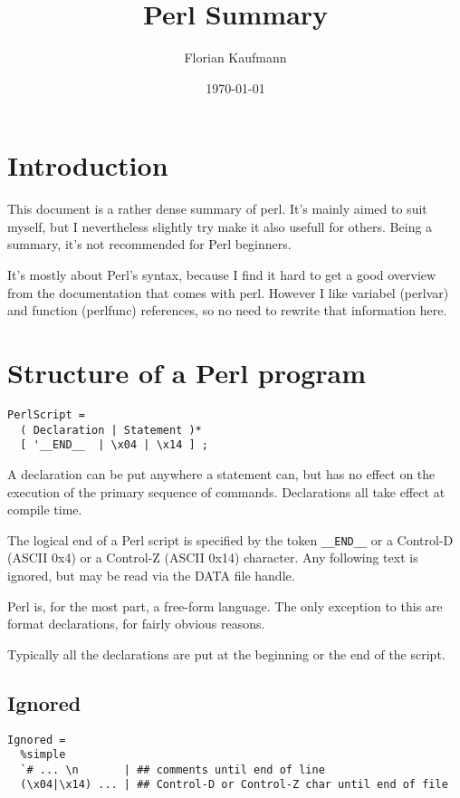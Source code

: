 \documentclass{article}
\begin{document}
\author{Florian Kaufmann}
\title{Perl Summary}
\date{\today}
\maketitle
\tableofcontents

\section{Introduction}

This document is a rather dense summary of perl. It's mainly aimed to suit
myself, but I nevertheless slightly try make it also usefull for others. Being a
summary, it's not recommended for Perl beginners.

It's mostly about Perl's syntax, because I find it hard to get a good overview
from the documentation that comes with perl. However I like variabel (perlvar)
and function (perlfunc) references, so no need to rewrite that information here.

\section{Structure of a Perl program}

\begin{verbatim}
PerlScript =
  ( Declaration | Statement )*
  [ '__END__  | \x04 | \x14 ] ;
\end{verbatim}

A declaration can be put anywhere a statement can, but has no effect on the
execution of the primary sequence of commands. Declarations all take effect at
compile time.

The logical end of a Perl script is specified by the token \verb|__END__| or a
Control-D (ASCII 0x4) or a Control-Z (ASCII 0x14) character. Any following text
is ignored, but may be read via the DATA file handle.

Perl is, for the most part, a free-form language. The only exception to this are
format declarations, for fairly obvious reasons.

Typically all the declarations are put at the beginning or the end of
the script.

\subsection{Ignored}

\begin{verbatim}
Ignored =
  %simple
  `# ... \n       | ## comments until end of line
  (\x04|\x14) ... | ## Control-D or Control-Z char until end of file
\end{verbatim}
\end{document}
